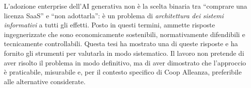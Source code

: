 L'adozione enterprise dell'AI generativa non è la scelta binaria tra ``comprare una licenza SaaS'' e ``non adottarla'': 
è un problema di \emph{architettura dei sistemi informativi} a tutti gli effetti. 
Posto in questi termini, ammette risposte ingegnerizzate che sono economicamente sostenibili, 
normativamente difendibili e tecnicamente controllabili. 
Questa tesi ha mostrato una di queste risposte e ha fornito gli strumenti per valutarla in modo sistematico. 
Il lavoro non pretende di aver risolto il problema in modo definitivo, ma di aver dimostrato che l'approccio è praticabile, misurabile e, 
per il contesto specifico di Coop Alleanza, preferibile alle alternative considerate.
